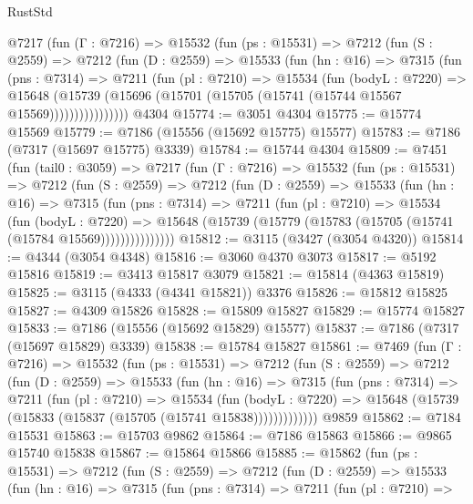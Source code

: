\begin{lexlean}{RustStd}
\begin{coremodule}
      @7217
        (fun (Γ : @7216) =>
        @15532
          (fun (ps : @15531) =>
          @7212
            (fun (S : @2559) =>
            @7212
              (fun (D : @2559) =>
              @15533
                (fun (hn : @16) =>
                @7315
                  (fun (pns : @7314) =>
                  @7211
                    (fun (pl : @7210) =>
                    @15534
                      (fun (bodyL : @7220) =>
                      @15648
                        (@15739
                          (@15696 (@15701 (@15705 (@15741 (@15744 @15567 @15569))))))))))))))))
    @4304
@15774 := @3051 @4304
@15775 := @15774 @15569
@15779 := @7186 (@15556 (@15692 @15775) @15577)
@15783 := @7186 (@7317 (@15697 @15775) @3339)
@15784 := @15744 @4304
@15809 := @7451
    (fun (tail0 : @3059) =>
    @7217
      (fun (Γ : @7216) =>
      @15532
        (fun (ps : @15531) =>
        @7212
          (fun (S : @2559) =>
          @7212
            (fun (D : @2559) =>
            @15533
              (fun (hn : @16) =>
              @7315
                (fun (pns : @7314) =>
                @7211
                  (fun (pl : @7210) =>
                  @15534
                    (fun (bodyL : @7220) =>
                    @15648 (@15739 (@15779 (@15783 (@15705 (@15741 (@15784 @15569)))))))))))))))
@15812 := @3115 (@3427 (@3054 @4320))
@15814 := @4344 (@3054 @4348)
@15816 := @3060 @4370 @3073
@15817 := @5192 @15816
@15819 := @3413 @15817 @3079
@15821 := @15814 (@4363 @15819)
@15825 := @3115 (@4333 (@4341 @15821)) @3376
@15826 := @15812 @15825
@15827 := @4309 @15826
@15828 := @15809 @15827
@15829 := @15774 @15827
@15833 := @7186 (@15556 (@15692 @15829) @15577)
@15837 := @7186 (@7317 (@15697 @15829) @3339)
@15838 := @15784 @15827
@15861 := @7469
    (fun (Γ : @7216) =>
    @15532
      (fun (ps : @15531) =>
      @7212
        (fun (S : @2559) =>
        @7212
          (fun (D : @2559) =>
          @15533
            (fun (hn : @16) =>
            @7315
              (fun (pns : @7314) =>
              @7211
                (fun (pl : @7210) =>
                @15534
                  (fun (bodyL : @7220) =>
                  @15648 (@15739 (@15833 (@15837 (@15705 (@15741 @15838)))))))))))))
    @9859
@15862 := @7184 @15531
@15863 := @15703 @9862
@15864 := @7186 @15863
@15866 := @9865 @15740 @15838
@15867 := @15864 @15866
@15885 := @15862
    (fun (ps : @15531) =>
    @7212
      (fun (S : @2559) =>
      @7212
        (fun (D : @2559) =>
        @15533
          (fun (hn : @16) =>
          @7315
            (fun (pns : @7314) =>
            @7211
              (fun (pl : @7210) =>

\end{coremodule}
\end{lexlean}
